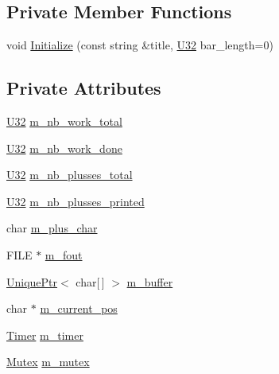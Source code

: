 \subsection*{Private Member Functions}
\begin{DoxyCompactItemize}
\item 
void \hyperlink{classmage_1_1_progress_reporter_a9eb8d1c64e2768f539cd3867b29bf408}{Initialize} (const string \&title, \hyperlink{namespacemage_a41c104c036fba3756a74e19f793eeaa1}{U32} bar\+\_\+length=0)
\end{DoxyCompactItemize}
\subsection*{Private Attributes}
\begin{DoxyCompactItemize}
\item 
\hyperlink{namespacemage_a41c104c036fba3756a74e19f793eeaa1}{U32} \hyperlink{classmage_1_1_progress_reporter_a5f3e7dd9faa3d247bd6dd3738aeb7120}{m\+\_\+nb\+\_\+work\+\_\+total}
\item 
\hyperlink{namespacemage_a41c104c036fba3756a74e19f793eeaa1}{U32} \hyperlink{classmage_1_1_progress_reporter_a94bdbb09ae95976c72f1a8387ff96b70}{m\+\_\+nb\+\_\+work\+\_\+done}
\item 
\hyperlink{namespacemage_a41c104c036fba3756a74e19f793eeaa1}{U32} \hyperlink{classmage_1_1_progress_reporter_a9afda919e0fa57c8aa7a6667385318c9}{m\+\_\+nb\+\_\+plusses\+\_\+total}
\item 
\hyperlink{namespacemage_a41c104c036fba3756a74e19f793eeaa1}{U32} \hyperlink{classmage_1_1_progress_reporter_a0279302ea777f9db2735fff1a8ae2d26}{m\+\_\+nb\+\_\+plusses\+\_\+printed}
\item 
char \hyperlink{classmage_1_1_progress_reporter_a00f36d331ba2b621855c545fcb92d948}{m\+\_\+plus\+\_\+char}
\item 
F\+I\+LE $\ast$ \hyperlink{classmage_1_1_progress_reporter_ad325ee5978fd1d16a97acbe37a977982}{m\+\_\+fout}
\item 
\hyperlink{namespacemage_a3316d7143a973e37adf1110f2e80ca31}{Unique\+Ptr}$<$ char\mbox{[}$\,$\mbox{]} $>$ \hyperlink{classmage_1_1_progress_reporter_ad05a4425246e206f867d54939eeb751b}{m\+\_\+buffer}
\item 
char $\ast$ \hyperlink{classmage_1_1_progress_reporter_a7adafaaf90edf29c8c27f4008aea41c9}{m\+\_\+current\+\_\+pos}
\item 
\hyperlink{classmage_1_1_timer}{Timer} \hyperlink{classmage_1_1_progress_reporter_aa3465bfcf344fd9f7f5f32255d90336b}{m\+\_\+timer}
\item 
\hyperlink{classmage_1_1_mutex}{Mutex} \hyperlink{classmage_1_1_progress_reporter_a32a499aa1b8fccbc8393fe32305dfeb1}{m\+\_\+mutex}
\end{DoxyCompactItemize}


